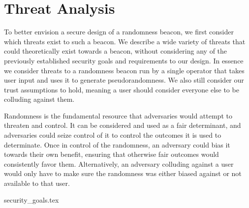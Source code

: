 \section{Threat Analysis}
To better envision a secure design of a randomness beacon, we first consider which threats exist to such a beacon. We describe a wide variety of threats that could theoretically exist towards a beacon, without considering any of the previously established security goals and requirements to our design. In essence we consider threats to a randomness beacon run by a single operator that takes user input and uses it to generate pseudorandomness. We also still consider our trust assumptions to hold, meaning a user should consider everyone else to be colluding against them.

Randomness is the fundamental resource that adversaries would attempt to threaten and control. It can be considered and used as a fair determinant, and adversaries could seize control of it to control the outcomes it is used to determinate. Once in control of the randomness, an adversary could bias it towards their own benefit, ensuring that otherwise fair outcomes would consistently favor them. Alternatively, an adversary colluding against a user would only have to make sure the randomness was either biased against or not available to that user.

{security_goals.tex}
